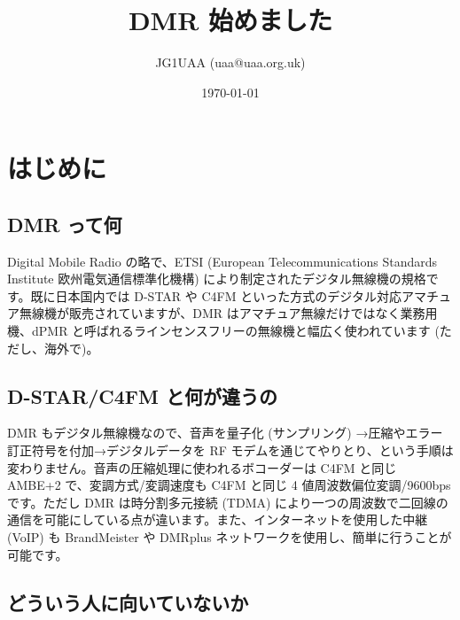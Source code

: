 \documentclass[a4j,oneside]{ujbook}
\begin{document}
\title{DMR 始めました}
\author{JG1UAA (uaa@uaa.org.uk)}
\date{\today}

\maketitle
\tableofcontents

\chapter{はじめに}

\section{DMR って何}

Digital Mobile Radio の略で、ETSI (European Telecommunications Standards Institute 欧州電気通信標準化機構) により制定されたデジタル無線機の規格です。既に日本国内では D-STAR や C4FM といった方式のデジタル対応アマチュア無線機が販売されていますが、DMR はアマチュア無線だけではなく業務用機、dPMR と呼ばれるラインセンスフリーの無線機と幅広く使われています (ただし、海外で)。

\section{D-STAR/C4FM と何が違うの}

DMR もデジタル無線機なので、音声を量子化 (サンプリング) →圧縮やエラー訂正符号を付加→デジタルデータを RF モデムを通じてやりとり、という手順は変わりません。音声の圧縮処理に使われるボコーダーは C4FM と同じ AMBE+2 で、変調方式/変調速度も C4FM と同じ 4 値周波数偏位変調/9600bps です。ただし DMR は時分割多元接続 (TDMA) により一つの周波数で二回線の通信を可能にしている点が違います。また、インターネットを使用した中継 (VoIP) も BrandMeister や DMRplus ネットワークを使用し、簡単に行うことが可能です。

\section{どういう人に向いていないか}
\end{document}
